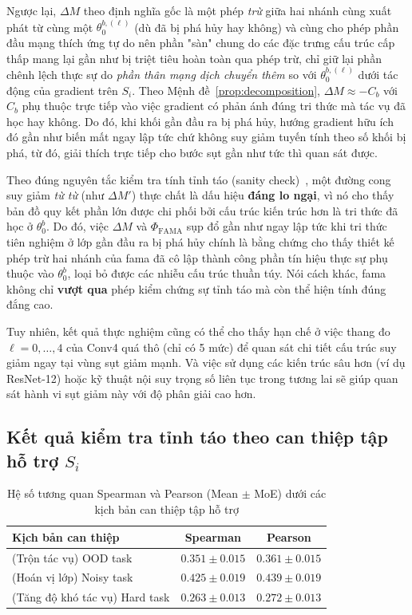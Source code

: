 Ngược lại, $\Delta M$ theo định nghĩa gốc là một phép \emph{trừ} giữa hai nhánh cùng xuất phát từ cùng một $\theta_0^{b,(\ell)}$ (dù đã bị phá hủy hay không) và cùng cho phép phần đầu mạng thích ứng tự do nên phần "sàn" chung do các đặc trưng cấu trúc cấp thấp mang lại gần như bị triệt tiêu hoàn toàn qua phép trừ, chỉ giữ lại phần chênh lệch thực sự do \emph{phần thân mạng dịch chuyển thêm} so với $\theta_0^{b,(\ell)}$ dưới tác động của gradient trên $S_i$. Theo Mệnh đề~\ref{prop:decomposition}, $\Delta M \approx -C_b$ với $C_b$ phụ thuộc trực tiếp vào việc gradient có phản ánh đúng tri thức mà tác vụ đã học hay không. Do đó, khi khối gần đầu ra bị phá hủy, hướng gradient hữu ích đó gần như biến mất ngay lập tức chứ không suy giảm tuyến tính theo số khối bị phá, từ đó, giải thích trực tiếp cho bước sụt gần như tức thì quan sát được.

Theo đúng nguyên tắc kiểm tra tính tỉnh táo (sanity check)~\cite{adebayo2018sanity}, một đường cong suy giảm \emph{từ từ} (như $\Delta M'$) thực chất là dấu hiệu \textbf{đáng lo ngại}, vì nó cho thấy bản đồ quy kết phần lớn được chi phối bởi cấu trúc kiến trúc hơn là tri thức đã học ở $\theta_0^b$. Do đó, việc $\Delta M$ và $\Phi_{\text{FAMA}}$ sụp đổ gần như ngay lập tức khi tri thức tiên nghiệm ở lớp gần đầu ra bị phá hủy chính là bằng chứng cho thấy thiết kế phép trừ hai nhánh của \acrshort{fama} đã cô lập thành công phần tín hiệu thực sự phụ thuộc vào $\theta_0^b$, loại bỏ được các nhiễu cấu trúc thuần túy. Nói cách khác, \acrshort{fama} không chỉ \textbf{vượt qua} phép kiểm chứng sự tỉnh táo mà còn thể hiện tính đúng đắng cao.

Tuy nhiên, kết quả thực nghiệm cũng có thể cho thấy hạn chế ở việc thang đo $\ell=0,\dots,4$ của Conv4 quá thô (chỉ có 5 mức) để quan sát chi tiết cấu trúc suy giảm ngay tại vùng sụt giảm mạnh. Và việc sử dụng các kiến trúc sâu hơn (ví dụ ResNet-12) hoặc kỹ thuật nội suy trọng số liên tục trong tương lai sẽ giúp quan sát hành vi sụt giảm này với độ phân giải cao hơn.

\subsection{Kết quả kiểm tra tỉnh táo theo can thiệp tập hỗ trợ $S_i$}
\label{subsec:sanity_support_results}

\begin{table}[H]
\centering
\caption{Hệ số tương quan Spearman và Pearson (Mean $\pm$ MoE) dưới các kịch bản can thiệp tập hỗ trợ}
\label{tab:sanity_support_set}
\begin{tabular}{|l|c|c|}
\hline
\textbf{Kịch bản can thiệp} & \textbf{Spearman} & \textbf{Pearson} \\ \hline
(Trộn tác vụ) OOD task & $0.351 \pm 0.015$ & $0.361 \pm 0.015$ \\ \hline
(Hoán vị lớp) Noisy task & $0.425 \pm 0.019$ & $0.439 \pm 0.019$ \\ \hline
(Tăng độ khó tác vụ) Hard task & $0.263 \pm 0.013$ & $0.272 \pm 0.013$ \\ \hline
\end{tabular}
\end{table}

